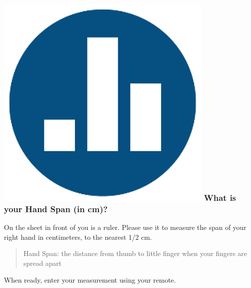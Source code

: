 
\begin{frame}

\frametitle{\includegraphics[scale = 0.05]{./images/clicker} \hfill  What is your Hand Span (in cm)?}

On the sheet in front of you is a ruler. Please use it to measure the span of your right hand in centimeters, to the nearest 1/2 cm. 

\vspace{2em}
\begin{quote}Hand Span: the distance from thumb to little finger when your fingers are spread apart\end{quote}

\vspace{2em}
When ready, enter your measurement using your remote.
\end{frame}

